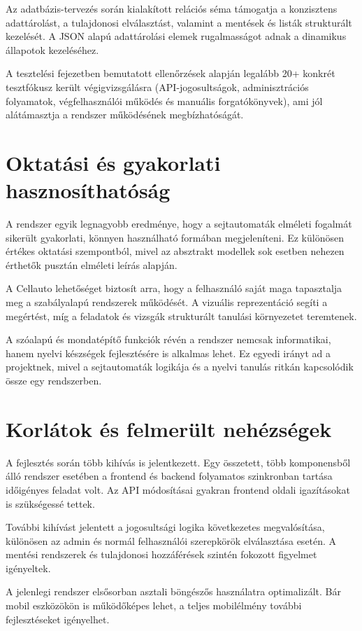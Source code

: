 \documentclass{thesis-ekf}
\begin{document}
Az adatbázis-tervezés során kialakított relációs séma támogatja a konzisztens adattárolást, a tulajdonosi elválasztást, valamint a mentések és listák strukturált kezelését. A JSON alapú adattárolási elemek rugalmasságot adnak a dinamikus állapotok kezeléséhez.

A tesztelési fejezetben bemutatott ellenőrzések alapján legalább 20+ konkrét tesztfókusz került végigvizsgálásra (API-jogosultságok, adminisztrációs folyamatok, végfelhasználói működés és manuális forgatókönyvek), ami jól alátámasztja a rendszer működésének megbízhatóságát.

\section{Oktatási és gyakorlati hasznosíthatóság}
A rendszer egyik legnagyobb eredménye, hogy a sejtautomaták elméleti fogalmát sikerült gyakorlati, könnyen használható formában megjeleníteni. Ez különösen értékes oktatási szempontból, mivel az absztrakt modellek sok esetben nehezen érthetők pusztán elméleti leírás alapján.

A Cellauto lehetőséget biztosít arra, hogy a felhasználó saját maga tapasztalja meg a szabályalapú rendszerek működését. A vizuális reprezentáció segíti a megértést, míg a feladatok és vizsgák strukturált tanulási környezetet teremtenek.

A szóalapú és mondatépítő funkciók révén a rendszer nemcsak informatikai, hanem nyelvi készségek fejlesztésére is alkalmas lehet. Ez egyedi irányt ad a projektnek, mivel a sejtautomaták logikája és a nyelvi tanulás ritkán kapcsolódik össze egy rendszerben.

\section{Korlátok és felmerült nehézségek}
A fejlesztés során több kihívás is jelentkezett. Egy összetett, több komponensből álló rendszer esetében a frontend és backend folyamatos szinkronban tartása időigényes feladat volt. Az API módosításai gyakran frontend oldali igazításokat is szükségessé tettek.

További kihívást jelentett a jogosultsági logika következetes megvalósítása, különösen az admin és normál felhasználói szerepkörök elválasztása esetén. A mentési rendszerek és tulajdonosi hozzáférések szintén fokozott figyelmet igényeltek.

A jelenlegi rendszer elsősorban asztali böngészős használatra optimalizált. Bár mobil eszközökön is működőképes lehet, a teljes mobilélmény további fejlesztéseket igényelhet.
\end{document}
